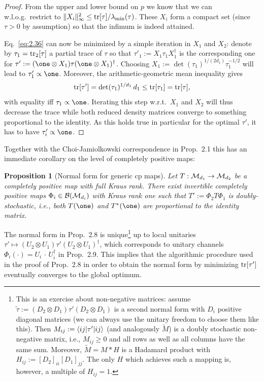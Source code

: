 \documentclass[11pt,a4paper]{article}
\numberwithin{equation}{section}
\theoremstyle{plain}
\newtheorem{proposition}{Proposition}[section]
\theoremstyle{definition}
\begin{document}
\begin{proof}
    From the upper and lower bound on $p$ we know that we can w.l.o.g.\ restrict to
    $\|X_i\|_\infty^2 \le \operatorname{tr}[\tau]/\lambda_{\min}(\tau)$. These $X_i$ form a compact set
    (since $\tau>0$ by assumption) so that the infimum is indeed attained.

    Eq.~\eqref{eq:2.36} can now be minimized by a simple iteration in $X_1$ and $X_2$:
    denote by $\tau_1=\operatorname{tr}_2[\tau]$ a partial trace of $\tau$ so that
    $\tau'_1 := X_1 \tau_1 X_1^\dagger$ is the corresponding one for
    $\tau':=(\one\otimes X_1)\tau(\one\otimes X_1)^\dagger$. Choosing
    $X_1 := \det(\tau_1)^{1/(2d_1)} \tau_1^{-1/2}$ will lead to $\tau'_1\propto \one$.
    Moreover, the arithmetic-geometric mean inequality gives
    \begin{equation}\label{eq:2.37}
        \operatorname{tr}[\tau'] = \det(\tau_1)^{1/d_1}\,d_1 \le \operatorname{tr}[\tau_1] = \operatorname{tr}[\tau],
    \end{equation}
    with equality iff $\tau_1\propto \one$. Iterating this step w.r.t.\ $X_1$ and $X_2$
    will thus decrease the trace while both reduced density matrices converge to
    something proportional to the identity. As this holds true in particular for the
    optimal $\tau'$, it has to have $\tau'_i \propto \one$.
\end{proof}

Together with the Choi-Jamiolkowski correspondence in Prop.~2.1 this has an
immediate corollary on the level of completely positive maps:

\begin{proposition}[Normal form for generic cp maps]
    Let $T:\mathcal{M}_{d_1} \to \mathcal{M}_{d_2}$ be a completely positive map with full Kraus rank.
    There exist invertible completely positive maps $\Phi_i \in \mathcal{B}(\mathcal{M}_{d_i})$ with
    Kraus rank one such that $T':=\Phi_2T\Phi_1$ is doubly-stochastic, i.e., both
    $T(\one)$ and $T^*(\one)$ are proportional to the identity matrix.
\end{proposition}

The normal form in Prop.~2.8 is unique\footnote{This is an exercise about
non-negative matrices: assume $\widetilde{\tau}:=(D_2\otimes D_1)\tau'(D_2\otimes D_1)$
is a second normal form with $D_i$ positive diagonal matrices (we can always use the
unitary freedom to choose them like this). Then $M_{ij}:=\langle ij|\tau'|ij\rangle$
(and analogously $\widetilde{M}$) is a doubly stochastic non-negative matrix, i.e.,
$M_{ij}\ge 0$ and all rows as well as all columns have the same sum. Moreover,
$\widetilde{M}=M * H$ is a Hadamard product with $H_{ij}:=[D_2]_{ii}[D_1]_{jj}$. The
                only $H$ which achieves such a mapping is, however, a multiple of $H_{ij}=1$.} up to
    local unitaries $\tau' \mapsto (U_2\otimes U_1)\tau'(U_2\otimes U_1)^\dagger$, which
    corresponds to unitary channels $\Phi_i(\cdot)=U_i\,\cdot\,U_i^\dagger$ in
    Prop.~2.9. This implies that the algorithmic procedure used in the proof of
    Prop.~2.8 in order to obtain the normal form by minimizing $\operatorname{tr}[\tau']$ eventually
    converges to the global optimum.
\end{document}
